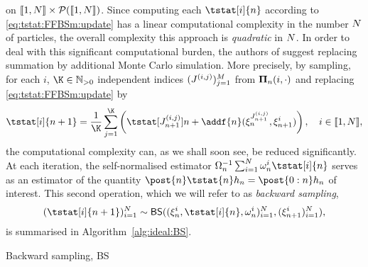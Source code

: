 on $\llbracket 1, N \rrbracket \times \mathcal{P}(\llbracket 1, N \rrbracket)$. Since computing each $\tstat[i]{n}$ according to \eqref{eq:tstat:FFBSm:update} has a linear computational complexity in the number $N$ of particles, the overall complexity this approach is \emph{quadratic} in $N$. In order to deal with this significant computational burden, the authors of \cite{olsson:westerborn:2014b} suggest replacing summation by additional Monte Carlo simulation. More precisely, by sampling, for each $i$, $\K \in \nsetpos$ independent indices $(J^{(i, j)})_{j = 1}^M$ from $\boldsymbol{\Pi}_{n}(i, \cdot)$ and replacing \eqref{eq:tstat:FFBSm:update} by  
\begin{equation} \label{eq:PaRIS:update}
\tstat[i]{n + 1} = \frac{1}{\K} \sum_{j = 1}^{\K} \left( \tstat[\bi{n + 1}{i}{j}]{n} + \addf{n}(\epart{n}{\bi{n + 1}{i}{j}}, \epart{n + 1}{i}) \right), \quad i \in \intvect{1}{\N}, 
\end{equation}
the computational complexity can, as we shall soon see, be reduced significantly. At each iteration, the self-normalised estimator $\sumwght{n}^{-1} \sum_{i = 1}^\N \ewght{n}{i} \tstat[i]{n}$ serves as an estimator of the quantity $\post{n} \tstat{n} h_n = \post{0:n} h_n$ of interest. This second operation, which we will refer to as \emph{backward sampling}, 
$$
    (\tstat[i]{n + 1})_{i = 1}^\N \sim \mathsf{BS}((\epart{n}{i}, \tstat[i]{n}, \ewght{n}{i})_{i = 1}^\N, (\epart{n + 1}{i})_{i = 1}^\N),  
$$
is summarised in Algorithm~\ref{alg:ideal:BS}. 

\begin{algorithm}[h] 
\caption{Backward sampling, \textsf{BS}} \label{alg:ideal:BS}
\end{algorithm}


